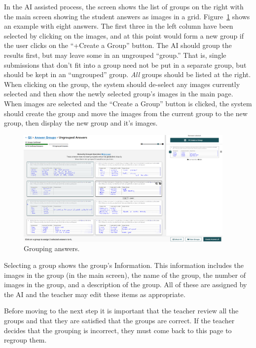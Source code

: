 \documentclass[ms,twoside,print]{nuthesis}
\begin{document}
In the AI assisted process, the screen shows the list of groups on the right with the main screen showing the student answers as images in a grid. Figure~\ref{fig:answer-grouping} shows an example with eight answers. The first three in the left column have been selected by clicking on the images, and at this point would form a new group if the user clicks on the ``+Create a Group'' button. The AI should group the results first, but may leave some in an ungrouped ``group.'' That is, single submissions that don't fit into a group need not be put in a separate group, but should be kept in an ``ungrouped'' group. \textit{All} groups should be listed at the right. When clicking on the group, the system should de-select any images currently selected and then show the newly selected group's images in the main page. When images are selected and the ``Create a Group'' button is clicked, the system should create the group and move the images from the current group to the new group, then display the new group and it's images. 

\begin{figure}[htb]
    \centering
    \includegraphics[width=0.95\textwidth]{images/grouping-answers.png}
    \caption{Grouping answers.}
    \label{fig:answer-grouping}
\end{figure}

Selecting a group shows the group's Information. This information includes the images in the group (in the main screen), the name of the group, the number of images in the group, and a description of the group. All of these are assigned by the AI and the teacher may edit these items as appropriate. 

Before moving to the next step it is important that the teacher review all the groups and that they are satisfied that the groups are correct. If the teacher decides that the grouping is incorrect, they must come back to this page to regroup them. 
\end{document}
